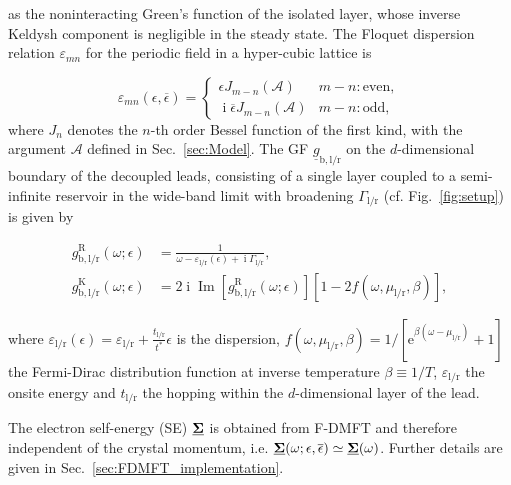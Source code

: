 \documentclass[aps,prb,groupedaddress,showpacs,twocolumn,superscriptaddress,10pt]{revtex4-2}
\newcommand{\ee}{\mathrm{e}}  %
\DeclareMathOperator*{\ii}{i} %
\DeclareMathOperator*{\iim}{Im}
\newcommand{\aamp}{\mathcal{A}}
\begin{document}
as the noninteracting Green's function of the isolated layer, whose inverse Keldysh component is negligible in the steady state. The Floquet dispersion relation $\varepsilon_{mn}$ for the periodic field in a hyper-cubic lattice is~\cite{ts.ok.08} 

\begin{equation}
\label{eq:Floquet_disp}
\varepsilon_{mn}(\epsilon,\overline{\epsilon}) = \begin{cases}
\epsilon J_{m-n}(\aamp) & m-n:\text{even}, \\
\ii\overline{\epsilon}J_{m-n}(\aamp) & m-n:\text{odd},
\end{cases}
\end{equation} 
% 
where $J_n$ denotes the $n$-th order Bessel function of the first kind, with the argument $\aamp$ defined in Sec.~\ref{sec:Model}. The  GF $\underline{g}_{\text{b},\text{l}/\text{r}}$ on the $d$-dimensional boundary of the decoupled leads,  consisting of a single layer coupled to a semi-infinite reservoir in the wide-band limit with broadening $\Gamma_{\text{l}/\text{r}}$ (cf. Fig.~\ref{fig:setup}) is given by
  
\begin{align}
g^{\text{R}}_{\text{b},\text{l}/\text{r}}(\omega;\epsilon) &= \frac{1}{\omega-\varepsilon_{\text{l}/\text{r}}(\epsilon)+\ii\Gamma_{\text{l}/\text{r}}},\label{eq:retarded_bath_GF} \\
g^{\text{K}}_{\text{b},\text{l}/\text{r}}(\omega;\epsilon) &= 2\ii \iim[g_{\text{b},\text{l}/\text{r}}^{\text{R}}(\omega;\epsilon)][1-2f(\omega,\mu_{\text{l}/\text{r}},\beta)], \label{eq:keldysh_bath_GF}
\end{align} 

where $\varepsilon_{\text{l}/\text{r}}(\epsilon)=\varepsilon_{\text{l}/\text{r}} +\frac{t_{\text{l}/\text{r}}}{t^\ast}\epsilon$ is the dispersion, $f(\omega,\mu_{\text{l}/\text{r}},\beta)=1/[\ee^{\beta(\omega-\mu_{\text{l}/\text{r}})}+1]$ the Fermi-Dirac distribution function at inverse temperature $\beta \equiv 1/T$, $\varepsilon_{\text{l}/\text{r}}$ the onsite energy and $t_{\text{l}/\text{r}}$ the hopping within the $d$-dimensional layer of the lead.  

The electron self-energy (SE) $\underline{\bf{\Sigma}}$ is obtained from F-DMFT and therefore independent of the crystal momentum, i.e. $\underline{\bf{\Sigma}}(\omega;\epsilon,\overline{\epsilon}) \simeq \underline{\bf{\Sigma}}(\omega)$. Further details are given in Sec.~\ref{sec:FDMFT_implementation}. 
\end{document}
